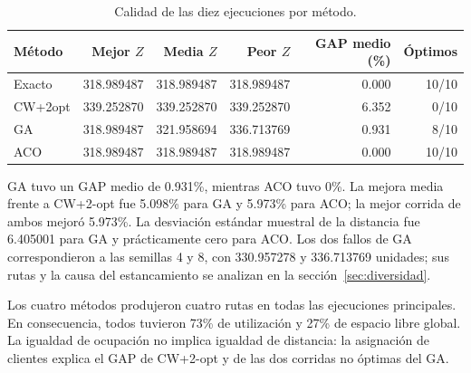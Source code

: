 \documentclass[11pt,a4paper]{article}
\numberwithin{equation}{section}
\begin{document}
\begin{table}[H]\centering\small
\caption{Calidad de las diez ejecuciones por método.}\label{tab:calidad}
\begin{tabular}{lrrrrr}\toprule
Método & Mejor \(Z\) & Media \(Z\) & Peor \(Z\) & GAP medio (\%) & Óptimos\\\midrule
Exacto & 318.989487 & 318.989487 & 318.989487 & 0.000 & 10/10\\
CW+2opt & 339.252870 & 339.252870 & 339.252870 & 6.352 & 0/10\\
GA & 318.989487 & 321.958694 & 336.713769 & 0.931 & 8/10\\
ACO & 318.989487 & 318.989487 & 318.989487 & 0.000 & 10/10\\\bottomrule
\end{tabular}
\end{table}

GA tuvo un GAP medio de 0.931\%, mientras ACO tuvo 0\%. La mejora media frente a CW+2-opt fue 5.098\% para GA y 5.973\% para ACO; la mejor corrida de ambos mejoró 5.973\%. La desviación estándar muestral de la distancia fue 6.405001 para GA y prácticamente cero para ACO. Los dos fallos de GA correspondieron a las semillas 4 y 8, con 330.957278 y 336.713769 unidades; sus rutas y la causa del estancamiento se analizan en la sección~\ref{sec:diversidad}.

Los cuatro métodos produjeron cuatro rutas en todas las ejecuciones principales. En consecuencia, todos tuvieron 73\% de utilización y 27\% de espacio libre global. La igualdad de ocupación no implica igualdad de distancia: la asignación de clientes explica el GAP de CW+2-opt y de las dos corridas no óptimas del GA.
\end{document}
